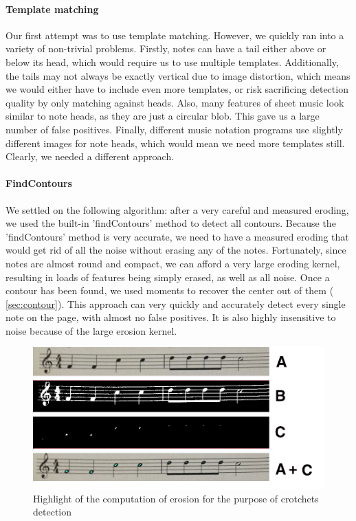 \paragraph{Template matching}

Our first attempt was to use template matching. However, we quickly ran into a variety of non-trivial problems. Firstly, notes can have a tail either above or below its head, which would require us to use multiple templates. Additionally, the tails may not always be exactly vertical due to image distortion, which means we would either have to include even more templates, or risk sacrificing
detection quality by only matching against heads. Also, many features of sheet music look similar to note heads, as they are just a circular blob. This gave us a large number of false positives. Finally, different music notation programs use slightly different images for note heads, which would mean we need more templates still. Clearly, we needed a different approach.

\paragraph{FindContours}

We settled on the following algorithm: after a very careful and measured eroding, we used the built-in 'findContours' method to detect all contours. Because the 'findContours' method is very accurate, we need to have a measured eroding that would get rid of all the noise without erasing any of the notes. Fortunately, since notes are almost round and compact, we can afford a very large
eroding kernel, resulting in loads of features being simply erased, as well as all noise.
Once a contour has been found, we used moments to recover the center out of them ( \autoref{sec:contour}). This approach can very quickly and accurately detect every single note on the page, with almost no false positives. It is also highly insensitive to noise because of the large erosion kernel.
\begin{figure}[h!]
    \centering
    \includegraphics[width=1\textwidth]{./assets/highlight.png}
    \caption{Highlight of the computation of erosion for the purpose of crotchets detection}
    \label{image:highlight}
\end{figure}


